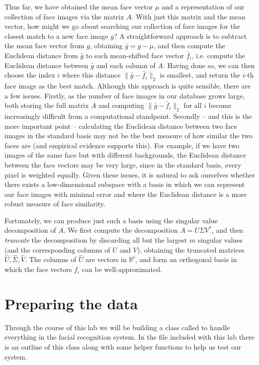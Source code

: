 Thus far, we have obtained the mean face vector $\mu$ and a representation of our collection of face images via the matrix $A$.
With just this matrix and the mean vector, how might we go about searching our collection of face images for the closest match to a new face image $g$?
A straightforward approach is to subtract the mean face vector from $g$, obtaining $\bar{g} = g-\mu$, and then compute the Euclidean distance from
$\bar{g}$ to each mean-shifted face vector $\bar{f}_i$, i.e. compute the Euclidean distance between $\bar{g}$ and each column of $A$. 
Having done so, we can then choose the index $i$ where this distance $\|\bar{g}-\bar{f}_i\|_2$ is smallest, and return the $i$-th face image as the best match.
Although this approach is quite sensible, there are a few issues. 
Firstly, as the number of face images in our database grows large, both storing the full matrix $A$ and computing $\|\bar{g}-\bar{f}_i\|_2$ for all $i$
become increasingly difficult from a computational standpoint.
Secondly -- and this is the more important point -- calculating the Euclidean distance between two face images in the standard basis may not be the best measure
of how similar the two faces are (and empirical evidence supports this).
For example, if we have two images of the same face but with different backgrounds, the Euclidean distance between the face vectors may be very large, 
since in the standard basis, every pixel is weighted equally.
Given these issues, it is natural to ask ourselves whether there exists a low-dimensional subspace with a basis in which we can represent our
face images with minimal error and where the Euclidean distance is a more robust measure of face similarity.

Fortunately, we can produce just such a basis using the singular value decomposition of $A$. 
We first compute the decomposition $A = U\Sigma V^*$, and then \emph{truncate} the decomposition by discarding all but the largest $m$ singular values 
(and the corresponding columns of $U$ and $V$), obtaining the truncated matrices $\hat{U}, \hat{\Sigma}, \hat{V}$.
The columns of $\hat{U}$ are vectors in $\mathbb{R}^l$, and form an orthogonal basis in which the face vectors $f_i$ can be well-approximated.  

\section*{Preparing the data}

Through the course of this lab we will be building a class called  to handle everything in the facial recognition system.
In the  file included with this lab there is an outline of this class along with some helper functions to help us test our system.


